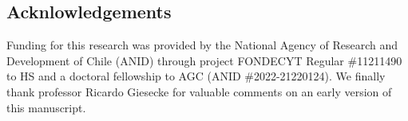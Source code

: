 \documentclass[12pt,authoryear]{elsarticle}
\begin{document}
\subsection*{Acknlowledgements}
Funding for this research was provided by the National Agency of Research and Development of Chile (ANID) through project FONDECYT Regular \#11211490 to HS and a doctoral fellowship to AGC (ANID \#2022-21220124).  We finally thank professor Ricardo Giesecke for valuable comments on an early version of this manuscript.

% 
% 
\end{document}
